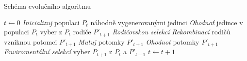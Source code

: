 

\begin{algorithm}
\caption{Schéma evolučního algoritmu}
\label{obreva2}
\begin{algorithmic}
\State $t \gets 0$
\State \emph{Inicializuj} populaci $P_t$ náhodně vygenerovanými jedinci
\State \emph{Ohodnoť} jedince v populaci $P_t$
\State 	vyber z $P_t$ rodiče $P'_{t+1}$ \emph{Rodičovskou selekcí}
\State 	\emph{Rekombinací} rodičů vzniknou potomci $P'_{t+1}$
\State 	\emph{Mutuj} potomky $P'_{t+1}$
\State 	\emph{Ohodnoť} potomky $P'_{t+1}$
\State 	\emph{Enviromentální selekcí} vyber $P_{t+1}$ z $P_t$ a $P'_{t+1}$
\State $t \gets t+1$
\EndWhile
\EndProcedure
\end{algorithmic}
\end{algorithm}

